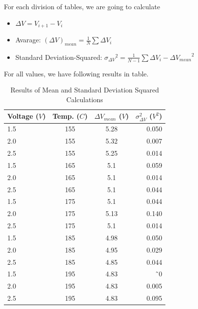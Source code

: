 \documentclass[aps,twocolumn,secnumarabic,nobalancelastpage,amsmath,amssymb,
nofootinbib]{revtex4}
\begin{document}
For each division of tables, we are going to calculate

\begin{itemize}



\item $\Delta{V}={V}_{i+1}-{V}_{i}$

\item Avarage: $(\Delta{V})_{mean}=\frac{1}{N}{\sum{\Delta{V}_i}}$
\item Standard Deviation-Squared: ${\sigma_{\Delta{V}}}^{2}=\frac{1}{N-1}{\sum{{\Delta{V_i}-\Delta{V}_{mean}}^{2}}}$

\end{itemize}

For all values, we have following results in table.


\begin{center}
\begin{table}[htbp]
\begin{tabular}{|l|c|c|r|}
\hline
{\small Voltage ($V$)} & {\small Temp. ($C$)} & {\small $\Delta{V}_{mean}$ ($V$)} & {\small $\sigma_{\Delta{V}}^{2}$ ($V^{2}$)} \\
\hline
1.5		&  	155	& 5.28 & 	0.050 \\
2.0		&  	155	& 5.32 & 	0.007 \\
2.5		&  	155	& 5.25 & 	0.014 \\
1.5		&  	165	&  5.1 & 	0.059 \\
2.0		&  	165	&  5.1 & 	0.014 \\
2.5		&  	165	&  5.1 & 	0.044  \\
1.5		&  	175	&  5.1& 	 0.044\\
2.0		&  	175	&  5.13& 	 0.140\\
2.5		&  	175	&  5.1& 	 0.014\\
1.5		&  	185	&  4.98& 	 0.050\\
2.0		&  	185	&  4.95& 	 0.029\\
2.5		&  	185	&  4.85& 	 0.044\\
1.5		&  	195	&  4.83& 	 \~\ 0\\
2.0		&  	195	&  4.83& 	 0.005\\
2.5		&  	195	&  4.83& 	 0.095\\


\hline
\end{tabular}
\caption{\label{tab:linfitresults} Results of Mean and Standard Deviation Squared Calculations}
\end{table}
\end{center}
\end{document}
